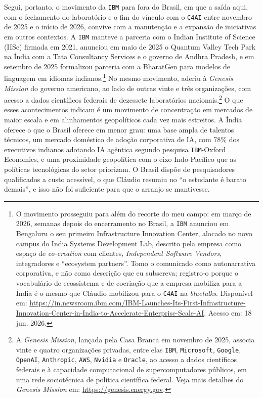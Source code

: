 Segui, portanto, o movimento da \texttt{IBM} para fora do Brasil, em que a saída aqui, com o fechamento do laboratório e o fim do vínculo com o \texttt{C4AI} entre novembro de 2025 e o início de 2026, convive com a manutenção e a expansão de iniciativas em outros contextos. A \texttt{IBM} manteve a parceria com o Indian Institute of Science (IISc) firmada em 2021, anunciou em maio de 2025 o Quantum Valley Tech Park na Índia com a Tata Consultancy Services e o governo de Andhra Pradesh, e em setembro de 2025 formalizou parceria com a BharatGen para modelos de linguagem em idiomas indianos.\footnote{O movimento prosseguiu para além do recorte do meu campo: em março de 2026, semanas depois do encerramento no Brasil, a \texttt{IBM} anunciou em Bengaluru o seu primeiro Infrastructure Innovation Center, alocado no novo campus do India Systems Development Lab, descrito pela empresa como espaço de \emph{co-creation} com clientes, \emph{Independent Software Vendors}, integradores e \enquote{ecosystem partners}. Tomo o comunicado como autonarrativa corporativa, e não como descrição que eu subscreva; registro-o porque o vocabulário de ecossistema e de cocriação que a empresa mobiliza para a Índia é o mesmo que Cláudio mobilizou para o \texttt{C4AI} na \textit{bluetalks}. Disponível em: \url{https://in.newsroom.ibm.com/IBM-Launches-Its-First-Infrastructure-Innovation-Center-in-India-to-Accelerate-Enterprise-Scale-AI}. Acesso em: 18 jun. 2026.} No mesmo movimento, aderiu à \textit{Genesis Mission} do governo americano, ao lado de outras vinte e três organizações, com acesso a dados científicos federais de dezessete laboratórios nacionais.\footnote{A \textit{Genesis Mission}, lançada pela Casa Branca em novembro de 2025, associa vinte e quatro organizações privadas, entre elas \texttt{IBM}, \texttt{Microsoft}, \texttt{Google}, \texttt{OpenAI}, \texttt{Anthropic}, \texttt{AWS}, \texttt{Nvidia} e \texttt{Oracle}, ao acesso a dados científicos federais e à capacidade computacional de supercomputadores públicos, em uma rede sociotécnica de política científica federal. Veja mais detalhes do \textit{Genesis Mission} em: \url{https://genesis.energy.gov}.} O que esses acontecimentos indicam é um movimento de concentração em mercados de maior escala e em alinhamentos geopolíticos cada vez mais estreitos. A Índia oferece o que o Brasil oferece em menor grau: uma base ampla de talentos técnicos, um mercado doméstico de adoção corporativa de IA, com 78\% dos executivos indianos adotando IA agêntica segundo pesquisa \texttt{IBM}-Oxford Economics, e uma proximidade geopolítica com o eixo Indo-Pacífico que as políticas tecnológicas do setor priorizam. O Brasil dispõe de pesquisadores qualificados a custo acessível, o que Cláudio resumiu no \enquote{o estudante é barato demais}, e isso não foi suficiente para que o arranjo se mantivesse.

